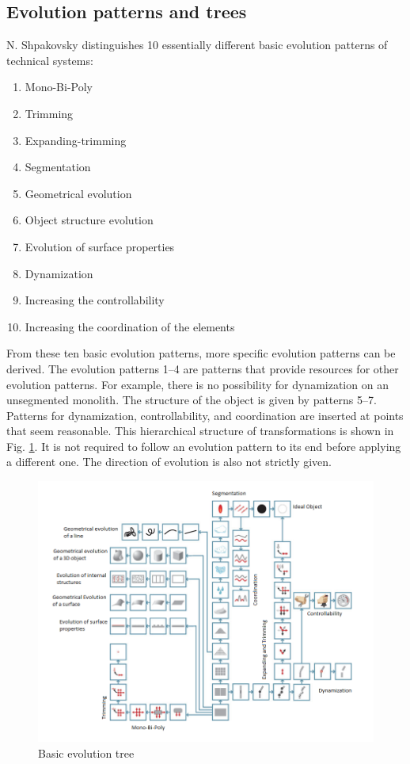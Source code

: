 \documentclass[11pt,a4paper]{article}
\begin{document}
\subsection{Evolution patterns and trees}

N. Shpakovsky \cite{Shpakovsky2016} distinguishes 10 essentially different
basic evolution patterns of technical systems:
\begin{enumerate}[noitemsep]
\item Mono-Bi-Poly
\item Trimming
\item Expanding-trimming
\item Segmentation
\item Geometrical evolution
\item Object structure evolution
\item Evolution of surface properties
\item Dynamization
\item Increasing the controllability
\item Increasing the coordination of the elements
\end{enumerate}

From these ten basic evolution patterns, more specific evolution patterns can
be derived. The evolution patterns 1--4 are patterns that provide resources
for other evolution patterns. For example, there is no possibility for
dynamization on an unsegmented monolith. The structure of the object is given
by patterns 5--7. Patterns for dynamization, controllability, and coordination
are inserted at points that seem reasonable. This hierarchical structure of
transformations is shown in Fig. \ref{fig:basic_evo}. It is not required to
follow an evolution pattern to its end before applying a different one. The
direction of evolution is also not strictly given.

\begin{figure}[htb]
  \centering
  \includegraphics[width=\linewidth]{figures/basictree.png}
  \caption{\small Basic evolution tree \cite{Shpakovsky2016}}
  \label{fig:basic_evo}
\end{figure}
\end{document}
